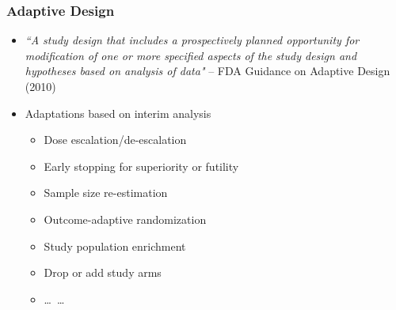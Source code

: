 \documentclass{beamer}
\begin{document}
\begin{frame}
	\frametitle{Adaptive Design}
  \begin{itemize}
	\item \emph{``A study design that includes a prospectively planned opportunity for modification of one or more specified aspects of the study design and hypotheses based on analysis of data"} -- FDA Guidance on Adaptive Design (2010)
	\item Adaptations based on interim analysis
	\begin{itemize}
	\item Dose escalation/de-escalation
	\item Early stopping for superiority or futility
	\item Sample size re-estimation
	\item Outcome-adaptive randomization
	\item Study population enrichment
	\item Drop or add study arms
    \item \ldots\ \ldots
	\end{itemize}		
	\end{itemize}
\end{frame}
\end{document}
